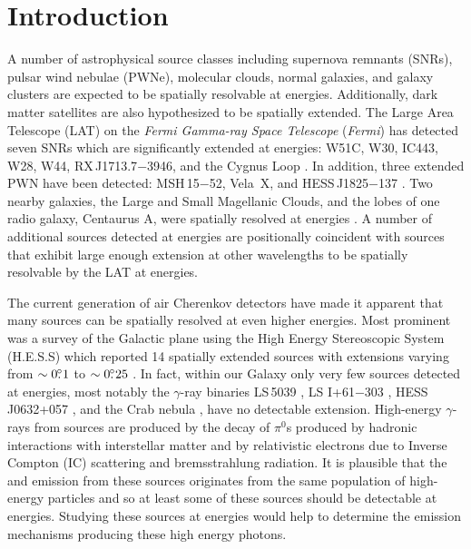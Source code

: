 \documentclass[12pt,preprint]{aastex}
\newcommand{\gev}{\text{GeV}\xspace}
\newcommand{\tev}{\text{TeV}\xspace}
\newcommand{\fermi}{\textit{Fermi}\xspace}
\begin{document}
\section{Introduction}

A number of astrophysical source classes including supernova remnants
(SNRs), pulsar wind nebulae (PWNe), molecular clouds, normal galaxies,
and galaxy clusters are expected to be spatially resolvable at
\gev energies.  Additionally, dark matter satellites are also hypothesized to
be spatially extended.  The Large Area Telescope
(LAT) on the {\em \fermi Gamma-ray Space Telescope} (\fermi) has
detected seven SNRs which are significantly extended
at \gev energies: 
W51C, W30, 
IC443, W28, W44, RX\,J1713.7$-$3946,
and the Cygnus Loop
\citep{w51c,w30_lat,ic443,w28,w44,rx_j1713_lat,cygnus_loop_lat}. In addition, 
three extended PWN have been detected: MSH\,15$-$52, Vela~X, and
HESS\,J1825$-$137 \citep{msh1552,velax,fermi_hess_j1825}. Two
nearby galaxies, the Large and Small Magellanic Clouds, 
and the lobes of one
radio galaxy, Centaurus A, were spatially resolved at \gev energies
\citep{lmc,smc,cen_a_lat}.  A number of additional sources detected
at \gev energies are positionally coincident with sources that exhibit
large enough extension at other wavelengths to be spatially
resolvable by the LAT at \gev energies.

The current generation of air Cherenkov detectors have
made it apparent that many sources can be spatially resolved
at even higher energies.
Most
prominent was a survey of the Galactic plane using the High Energy
Stereoscopic System (H.E.S.S) which reported 14 spatially extended
sources with extensions varying from $\sim0\mbox{$.\!\!^\circ$}1$ to $\sim0\mbox{$.\!\!^\circ$}25$
\citep{hess_plane_survey}.  In fact, within our Galaxy only very few
sources detected at \tev energies, most notably the $\gamma$-ray binaries
LS\,5039 \citep{HESSLS5039}, LS I+61$-$303 \citep{MAGICLSI, VERITASLSI},
HESS\,J0632+057 \citep{HESS0632}, and the Crab nebula \citep{crab_weekes},
have no detectable extension.  High-energy $\gamma$-rays from
\tev sources are produced by the decay of $\pi^0$s produced by hadronic
interactions with interstellar matter and by relativistic electrons
due to Inverse Compton (IC) scattering and bremsstrahlung radiation.  
It is plausible that the \gev and
\tev emission from these sources originates from the same population of
high-energy particles and so at least some of these sources should be
detectable at \gev energies.  Studying 
these \tev sources at \gev energies would help to
determine the emission mechanisms producing these high energy photons.
\end{document}
